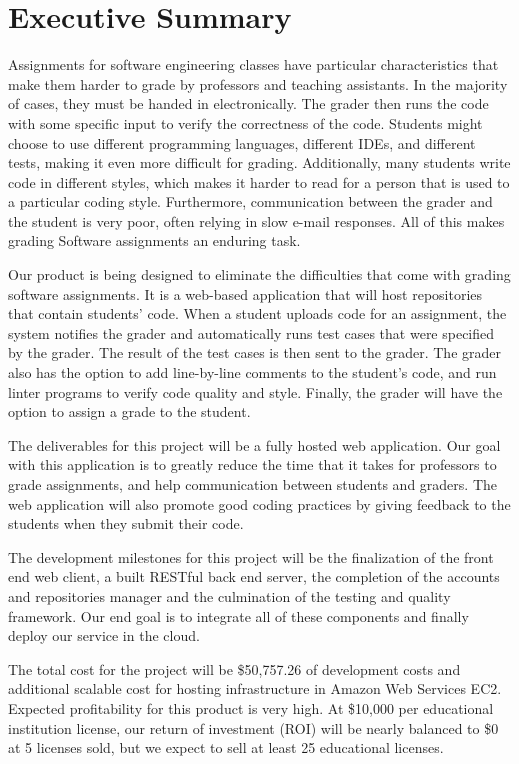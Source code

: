 \part*{Executive Summary}

Assignments for software engineering classes have particular characteristics
that make them harder to grade by professors and teaching assistants. In the
majority of cases, they must be handed in electronically. The grader then runs
the code with some specific input to verify the correctness of the code.
Students might choose to use different programming languages, different IDEs,
and different tests, making it even more difficult for grading. Additionally,
many students write code in different styles, which makes it harder to read for
a person that is used to a particular coding style. Furthermore, communication
between the grader and the student is very poor, often relying in slow e-mail
responses.  All of this makes grading Software assignments an enduring task.

Our product is being designed to eliminate the difficulties that come with
grading software assignments. It is a web-based application that will
host repositories that contain students' code. When a student uploads code
for an assignment, the system notifies the grader and automatically runs test
cases that were specified by the grader. The result of the test cases is then
sent to the grader. The grader also has the option to add line-by-line comments
to the student's code, and run linter programs to verify code quality and
style. Finally, the grader will have the option to assign a grade to the
student.

The deliverables for this project will be a fully hosted web application. Our
goal with this application is to greatly reduce the time that it takes for
professors to grade assignments, and help communication between students and
graders. The web application will also promote good coding practices by giving
feedback to the students when they submit their code.

The development milestones for this project will be the finalization of the
front end web client, a built RESTful back end server, the completion of the
accounts and repositories manager and the culmination of the testing and quality
framework. Our end goal is to integrate all of these components and finally
deploy our service in the cloud.


The total cost for the project will be \$50,757.26 of development costs and
additional scalable cost for hosting infrastructure in Amazon Web Services EC2.
Expected profitability for this product is very high. At \$10,000 per
educational institution license, our return of investment (ROI) will be nearly
balanced to \$0 at 5 licenses sold, but we expect to sell at least 25
educational licenses.
